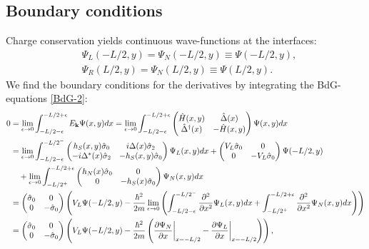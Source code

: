 \subsection{Boundary conditions}
\label{sec:BC}
Charge conservation yields continuous wave-functions at the interfaces:
\begin{equation}
\begin{split}
    &\Psi_L(-L/2,y) = \Psi_N(-L/2,y) \equiv \Psi(-L/2,y),\\
    &\Psi_R(L/2,y) = \Psi_N(L/2,y) \equiv \Psi(L/2,y).
\end{split}
\end{equation}
We find the boundary conditions for the derivatives by integrating the BdG-equations \eqref{BdG-2}:
\begin{equation*}
\begin{split}
    0 &= \lim_{\epsilon \rightarrow 0} \int_{-L/2-\epsilon}^{-L/2+\epsilon} E_{\mathbf{k}}\Psi(x,y) dx = \lim_{\epsilon \rightarrow 0} \int_{-L/2-\epsilon}^{-L/2+\epsilon}
    \begin{pmatrix}
    \hat{H}(x,y) & \hat{\Delta}(x) \\
    \hat{\Delta}^{\dagger}(x) & -\hat{H}(x,y)
    \end{pmatrix}
    \Psi(x,y)dx
    \\
    &=\lim_{\epsilon \rightarrow 0} \int_{-L/2-\epsilon}^{-L/2^-}
    \begin{pmatrix}
    h_S(x,y)\hat{\sigma}_0 & i\Delta(x)\hat{\sigma}_2 \\
    -i\Delta^*(x)\hat{\sigma}_2 & -h_S(x,y)\hat{\sigma}_0
    \end{pmatrix}
    \Psi_{L}(x,y)dx
    +
    \begin{pmatrix}
    V_L\hat{\sigma}_0 & 0\\
    0 & -V_L\hat{\sigma}_0
    \end{pmatrix}
    \Psi(-L/2,y)
    \\
    & \quad +\lim_{\epsilon \rightarrow 0} \int_{-L/2^+}^{-L/2+\epsilon}
    \begin{pmatrix}
    h_N(x)\hat{\sigma}_0 & 0 \\
    0 & -h_S(x)\hat{\sigma}_0
    \end{pmatrix}
    \Psi_{N}(x,y)dx\\
    &=
    \begin{pmatrix}
    \hat{\sigma}_0 & 0\\
    0 & -\hat{\sigma}_0
    \end{pmatrix}
    \left(
    V_L\Psi(-L/2,y)
    -\frac{\hbar^2}{2m}
    \lim_{\epsilon \rightarrow 0}
    \left(\int_{-L/2-\epsilon}^{-L/2^-} 
    \frac{\partial^2}{\partial x^2} \Psi_L(x,y) dx
    + \int_{-L/2^+}^{-L/2+\epsilon} 
    \frac{\partial^2}{\partial x^2} \Psi_N(x,y) dx \right)
    \right)\\
    &=
    \begin{pmatrix}
    \hat{\sigma}_0 & 0\\
    0 & -\hat{\sigma}_0
    \end{pmatrix}
    \left(
    V_L\Psi(-L/2,y) -
    \frac{\hbar^2}{2m}\left(
    \frac{\partial\Psi_N}{\partial x}\bigg|_{x=-L/2}
    -
    \frac{\partial\Psi_L}{\partial x}\bigg|_{x=-L/2}
    \right)\right),
\end{split}
\end{equation*}
